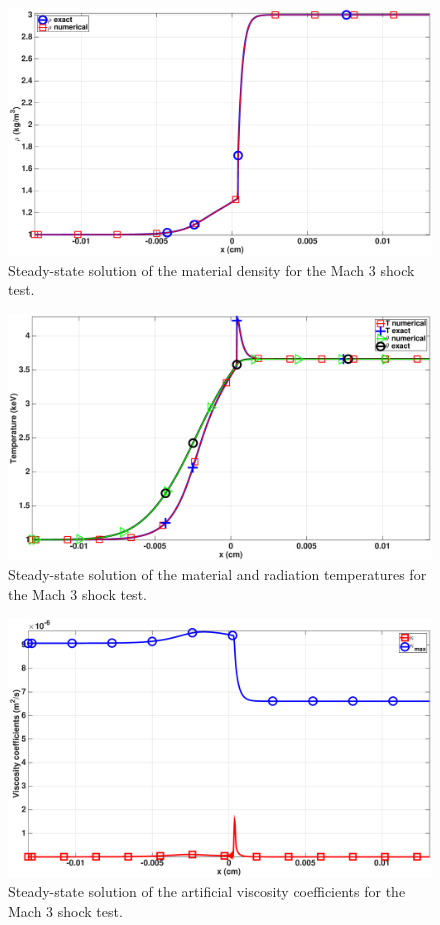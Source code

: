 \documentclass[times,doublespace]{fldauth}%
\begin{document}
\begin{figure}[H]
    \centering
    \includegraphics[width=\textwidth]{figures/cst-xs/mach_3_cst_xs_nel_1000_density.eps}
    \caption{Steady-state solution of the material density for the Mach 3 shock test.}\label{fig:mach-3-cst-xs-dens}
\end{figure}
%
\begin{figure}[H]
    \centering
    \includegraphics[width=\textwidth]{figures/cst-xs/mach_3_cst_xs_nel_1000_temperature.eps}
    \caption{Steady-state solution of the material and radiation temperatures for the Mach 3 shock test.}\label{fig:mach-3-cst-xs-temp}
\end{figure}
%
\begin{figure}[H]
    \centering
    \includegraphics[width=\textwidth]{figures/cst-xs/mach_3_cst_xs_nel_1000_viscosity.eps}
    \caption{Steady-state solution of the artificial viscosity coefficients for the Mach 3 shock test.}\label{fig:mach-3-cst-xs-visc}
\end{figure}
%
\end{document}
